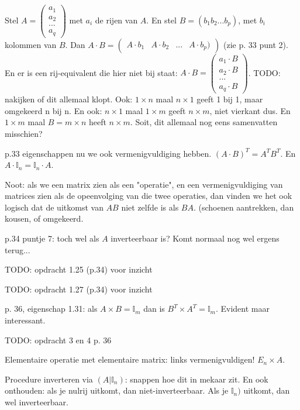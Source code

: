 \documentclass{article}
\begin{document}
Stel $A =  \begin{pmatrix} a_1 \\ a_2 \\ ... \\ a_q  \end{pmatrix}$ met $a_i$ de rijen van $A$. En stel $B = (b_1 b_2 ... b_p)$, met $b_i$ kolommen van $B$. 
Dan $A \cdot B = \begin{pmatrix} A\cdot b_1 & A\cdot b_2 & ... & A\cdot b_p) \end{pmatrix}$  (zie p. 33 punt 2). 
En er is een rij-equivalent die hier niet bij staat: $A \cdot B = \begin{pmatrix} a_1\cdot B \\  a_2\cdot B \\ ... \\ a_q\cdot B \end{pmatrix}$. TODO: nakijken of dit allemaal klopt. 
Ook: $1 \times n$ maal $n \times 1$ geeft 1 bij 1, maar omgekeerd n bij n. En ook: $n \times 1$ maal $1 \times m$ geeft $n \times m$, niet vierkant dus. En $1 \times m$ maal $B = m \times n$ heeft $n \times m$. 
Soit, dit allemaal nog eens samenvatten misschien? 

p.33 eigenschappen nu we ook vermenigvuldiging hebben. $(A \cdot B)^T = A^T B^T$. En $A \cdot \mathbb{I}_n = \mathbb{I}_n \cdot A$. 

Noot: als we een matrix zien als een "operatie", en een vermenigvuldiging van matrices zien als de opeenvolging van die twee operaties, dan vinden we het ook logisch dat de uitkomst van $AB$ niet zelfde is als $BA$. (schoenen aantrekken, dan kousen, of omgekeerd. 

p.34 puntje 7: toch wel als $A$ inverteerbaar is? Komt normaal nog wel ergens terug... 

TODO: opdracht 1.25 (p.34) voor inzicht

TODO: opdracht 1.27 (p.34) voor inzicht

p. 36, eigenschap 1.31: als $A \times B = \mathbb{I}_m$ dan is  $B^T \times A^T = \mathbb{I}_m$. Evident maar interessant. 

TODO: opdracht 3 en 4 p. 36

Elementaire operatie met elementaire matrix: links vermenigvuldigen! $E_n \times A$. 

Procedure inverteren via $(A|\mathbb{I}_n)$: snappen hoe dit in mekaar zit. En ook onthouden: als je nulrij uitkomt, dan niet-inverteerbaar. Als je $\mathbb{I}_n)$ uitkomt, dan wel inverteerbaar. 
\end{document}
